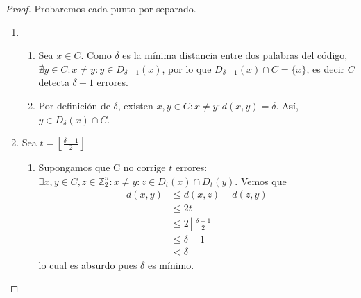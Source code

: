 \begin{proof}
Probaremos cada punto por separado.
\begin{enumerate}
\item
    \begin{enumerate}
        \item Sea $x\in C$. Como $\delta$ es la mínima distancia entre dos palabras del código, $\nexists y \in C : x \neq y : y \in D_{\delta-1}(x)$, por lo que $D_{\delta-1}(x) \cap C = \{ x \}$, es decir $C$ detecta $\delta - 1$ errores.
        \item Por definición de $\delta$, existen $x,y \in C : x \neq y : d(x,y) = \delta$. Así, $y \in D_{\delta}(x) \cap C$.
    \end{enumerate}

\item Sea $t = \left\lfloor{\frac{\delta - 1}{2}}\right\rfloor$
    \begin{enumerate}
        \item Supongamos que C no corrige $t$ errores: $\exists x,y \in C, z \in \mathbb{Z}_2^n: x \neq y : z \in D_t(x) \cap D_t(y)$. Vemos que
        \begin{align}
            d(x,y) &\le d(x,z) + d(z,y)\\
            & \le 2t\\
            & \le 2 \left\lfloor{\frac{\delta - 1}{2}}\right\rfloor\\
            & \le \delta - 1\\
            & < \delta
        \end{align}
        lo cual es absurdo pues $\delta$ es mínimo.
        

\end{enumerate}
\end{enumerate}
\end{proof}
